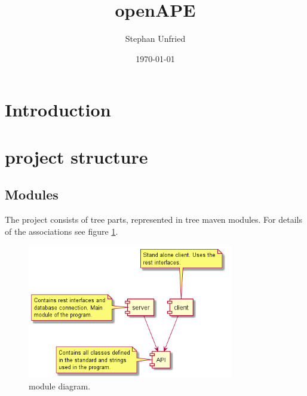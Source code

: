 \documentclass[10pt]{article}
\title{openAPE}
\author{Stephan Unfried}
\date{\today}
\begin{document}
\maketitle
\newpage
\tableofcontents
\newpage
\section{Introduction}
\section{project structure}
\subsection{Modules}
The project consists of tree parts, represented in tree maven modules. For details of the associations see figure \ref{fig:moduleuml}.
\begin{figure}[b]
\centering
\includegraphics[width=0.8\textwidth]{uml/modulesuml.png}
\caption{module diagram.}
\label{fig:moduleuml}
\end{figure}
\end{document}
